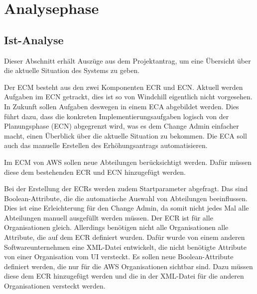 \section{Analysephase} 
\label{sec:Analysephase}


\subsection{Ist-Analyse} 
\label{sec:IstAnalyse}
Dieser Abschnitt erhält Auszüge aus dem Projektantrag, um eine Übersicht über die aktuelle Situation des Systems zu geben.

Der \ac{ECM} besteht aus den zwei Komponenten \ac{ECR} und \ac{ECN}.
Aktuell werden Aufgaben im \ac{ECN} getrackt, dies ist so von Windchill eigentlich nicht vorgesehen.
In Zukunft sollen Aufgaben deswegen in einem \ac{ECA} abgebildet werden.
Dies führt dazu, dass die konkreten Implementierungsaufgaben logisch von der Planungsphase (ECN) abgegrenzt wird, was es dem Change Admin einfacher macht, einen Überblick über die aktuelle Situation zu bekommen.
Die ECA soll auch das manuelle Erstellen des Erhöhungsantrags automatisieren.

Im \ac{ECM} von \ac{AWS} sollen neue Abteilungen berücksichtigt werden.
Dafür müssen diese dem bestehenden \ac{ECR} und \ac{ECN} hinzugefügt werden.

Bei der Erstellung der \acsp{ECR} werden zudem Startparameter abgefragt.
Das sind Boolean-Attribute, die die automatische Auswahl von Abteilungen beeinflussen.
Dies ist eine Erleichterung für den Change Admin, da somit nicht jedes Mal alle Abteilungen manuell ausgefüllt werden müssen.
Der \ac{ECR} ist für alle Organisationen gleich.
Allerdings benötigen nicht alle Organisationen alle Attribute, die auf dem \ac{ECR} definiert wurden.
Dafür wurde von einem anderen Softwareunternehmen eine XML-Datei entwickelt, die nicht benötigte Attribute von einer Organisation vom UI versteckt.
Es sollen neue Boolean-Attribute definiert werden, die nur für die \ac{AWS} Organisationen sichtbar sind.
Dazu müssen diese dem \ac{ECR} hinzugefügt werden und die in der XML-Datei für die anderen Organisationen versteckt werden.

